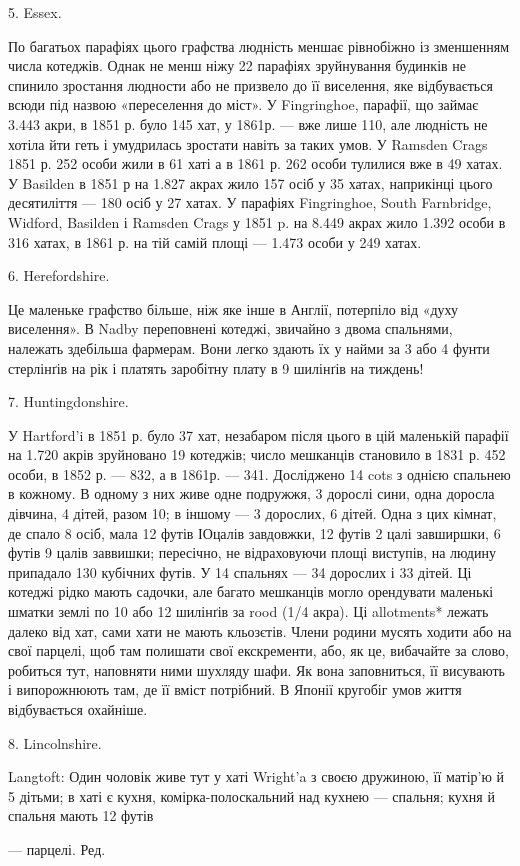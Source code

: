 \parcont{}  %
5. Essex.

По багатьох парафіях цього графства людність меншає рівнобіжно
із зменшенням числа котеджів. Однак не менш ніжу
22 парафіях зруйнування будинків не спинило зростання людности
або не призвело до її виселення, яке відбувається всюди під
назвою «переселення до міст». У Fingringhoe, парафії, що займає
3.443 акри, в 1851 р. було 145 хат, у 1861р. — вже лише 110, але
людність не хотіла йти геть і умудрилась зростати навіть за
таких умов. У Ramsden Crags 1851 р. 252 особи жили в 61 хаті
а в 1861 р. 262 особи тулилися вже в 49 хатах. У Basilden в 1851 р
на 1.827 акрах жило 157 осіб у 35 хатах, наприкінці цього десятиліття
— 180 осіб у 27 хатах. У парафіях Fingringhoe, South
Farnbridge, Widford, Basilden і Ramsden Crags у 1851 p. на
8.449 акрах жило 1.392 особи в 316 хатах, в 1861 р. на тій самій
площі — 1.473 особи у 249 хатах.

6. Herefordshire.

Це маленьке графство більше, ніж яке інше в Англії, потерпіло
від «духу виселення». В Nadby переповнені котеджі,
звичайно з двома спальнями, належать здебільша фармерам.
Вони легко здають їх у найми за 3 або 4 фунти стерлінґів на рік
і платять заробітну плату в 9 шилінґів на тиждень!

7. Huntingdonshire.

У Hartford’i в 1851 р. було 37 хат, незабаром після цього
в цій маленькій парафії на 1.720 акрів зруйновано 19 котеджів;
число мешканців становило в 1831 р. 452 особи, в 1852 р. — 832,
а в 1861р. — 341. Досліджено 14 cots з однією спальнею в кожному.
В одному з них живе одне подружжя, 3 дорослі сини, одна
доросла дівчина, 4 дітей, разом 10; в іншому — 3 дорослих,
6 дітей. Одна з цих кімнат, де спало 8 осіб, мала 12 футів ІОцалів
завдовжки, 12 футів 2 цалі завширшки, 6 футів 9 цалів заввишки;
пересічно, не відраховуючи площі виступів, на людину припадало
130 кубічних футів. У 14 спальнях — 34 дорослих і 33 дітей. Ці
котеджі рідко мають садочки, але багато мешканців могло орендувати
маленькі шматки землі по 10 або 12 шилінґів за rood (1/4 акра).
Ці allotments* лежать далеко від хат, сами хати не мають кльозєтів.
Члени родини мусять ходити або на свої парцелі, щоб там
полишати свої екскременти, або, як це, вибачайте за слово, робиться
тут, наповняти ними шухляду шафи. Як вона заповниться,
її висувають і випорожнюють там, де її вміст потрібний. В Японії
кругобіг умов життя відбувається охайніше.

8. Lincolnshire.

Langtoft: Один чоловік живе тут у хаті Wright’a з своєю дружиною,
її матір’ю й 5 дітьми; в хаті є кухня, комірка-полоскальний
над кухнею — спальня; кухня й спальня мають 12 футів

— парцелі. Ред.
\parbreak{}  %
